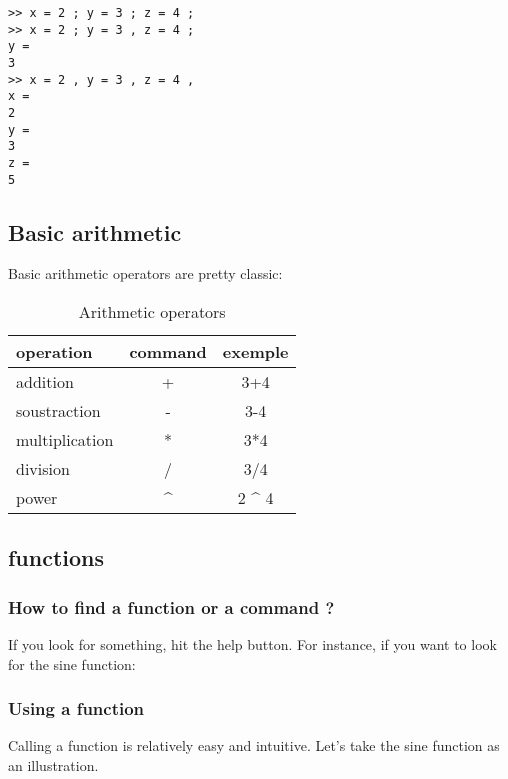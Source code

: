 \begin{lstlisting}
>> x = 2 ; y = 3 ; z = 4 ;
>> x = 2 ; y = 3 , z = 4 ;
y = 
3
>> x = 2 , y = 3 , z = 4 ,
x = 
2
y = 
3
z = 
5
\end{lstlisting}



\subsection{Basic arithmetic}


Basic arithmetic operators are pretty classic:

\begin{table}[h!]\caption{Arithmetic operators}
\center
\begin{tabular}{|l|c|c|}
	\hline
	operation & command & exemple \\
	\hline
	addition & + & 3+4 \\
	soustraction & - & 3-4 \\
 	multiplication & * & 3*4 \\
	division & / & 3/4 \\
	power & \^{} & 2 \^{} 4 \\
	\hline
\end{tabular}
\end{table}




\subsection{functions}
\subsubsection{How to find a function or a command ?}

If you look for something, hit the help button.
For instance, if you want to look for the sine function:




\subsubsection{Using a function}
Calling a function is relatively easy and intuitive. Let's take the sine function as an illustration. 

